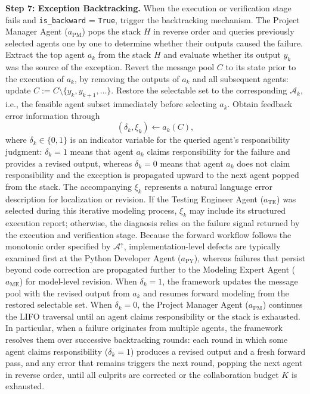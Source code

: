 \documentclass[preprint,12pt]{elsarticle}
\begin{document}
\medskip
\noindent\textbf{Step 7: Exception Backtracking.}
When the execution or verification stage fails and \texttt{is\_backward} = \texttt{True}, trigger the backtracking mechanism. The Project Manager Agent ($a_{\text{PM}}$) pops the stack $H$ in reverse order and queries previously selected agents one by one to determine whether their outputs caused the failure. Extract the top agent $a_k$ from the stack $H$ and evaluate whether its output $y_k$ was the source of the exception. Revert the message pool $C$ to its state prior to the execution of $a_k$, by removing the outputs of $a_k$ and all subsequent agents: update $C:= C\setminus\{y_k,y_{k+1},\ldots\}$. Restore the selectable set to the corresponding $\mathcal{A}_k$, i.e., the feasible agent subset immediately before selecting $a_k$. Obtain feedback error information through
\begin{equation}
\left(\delta_k,\xi_k\right)\gets a_k\left(C\right),
\end{equation}
where $\delta_k\in\{0,1\}$ is an indicator variable for the queried agent's responsibility judgment: $\delta_k=1$ means that agent $a_k$ claims responsibility for the failure and provides a revised output, whereas $\delta_k=0$ means that agent $a_k$ does not claim responsibility and the exception is propagated upward to the next agent popped from the stack. The accompanying $\xi_k$ represents a natural language error description for localization or revision. If the Testing Engineer Agent ($a_{\text{TE}}$) was selected during this iterative modeling process, $\xi_k$ may include its structured execution report; otherwise, the diagnosis relies on the failure signal returned by the execution and verification stage. Because the forward workflow follows the monotonic order specified by $\mathcal{A}^{\uparrow}$, implementation-level defects are typically examined first at the Python Developer Agent ($a_{\text{PY}}$), whereas failures that persist beyond code correction are propagated further to the Modeling Expert Agent ($a_{\text{ME}}$) for model-level revision. When $\delta_k=1$, the framework updates the message pool with the revised output from $a_k$ and resumes forward modeling from the restored selectable set. When $\delta_k=0$, the Project Manager Agent ($a_{\text{PM}}$) continues the LIFO traversal until an agent claims responsibility or the stack is exhausted. In particular, when a failure originates from multiple agents, the framework resolves them over successive backtracking rounds: each round in which some agent claims responsibility ($\delta_k=1$) produces a revised output and a fresh forward pass, and any error that remains triggers the next round, popping the next agent in reverse order, until all culprits are corrected or the collaboration budget $K$ is exhausted.
\end{document}
